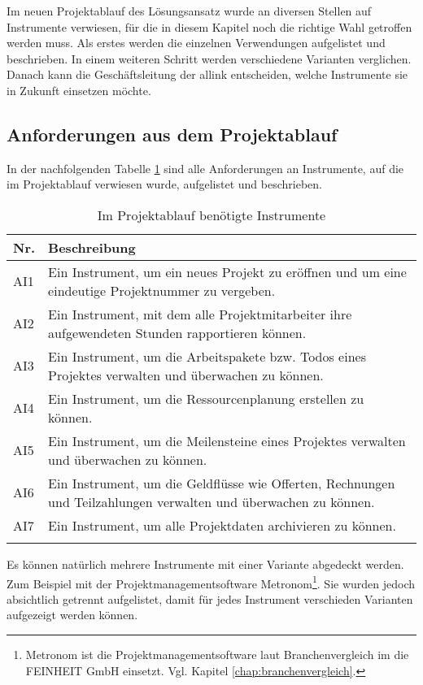 Im neuen Projektablauf des Lösungsansatz wurde an diversen Stellen auf Instrumente
verwiesen, für die in diesem Kapitel noch die richtige Wahl getroffen werden
muss. Als erstes werden die einzelnen Verwendungen aufgelistet und beschrieben.
In einem weiteren Schritt werden verschiedene Varianten verglichen. Danach
kann die Geschäftsleitung der allink entscheiden, welche Instrumente sie
in Zukunft einsetzen möchte.

\subsection{Anforderungen aus dem Projektablauf}
In der nachfolgenden Tabelle \ref{tab:projektablauf_instrumente} sind alle
Anforderungen an Instrumente, auf die im Projektablauf verwiesen wurde, aufgelistet 
und beschrieben.

\begin{longtable}{lp{14cm}}
    \toprule \textbf{Nr.} & \textbf{Beschreibung} \\
    \midrule AI1 & Ein Instrument, um ein neues Projekt zu eröffnen und um eine 
        eindeutige Projektnummer zu vergeben. \\
    \midrule AI2 & Ein Instrument, mit dem alle Projektmitarbeiter ihre 
        aufgewendeten Stunden rapportieren können. \\
    \midrule AI3 & Ein Instrument, um die Arbeitspakete bzw. Todos eines Projektes
        verwalten und überwachen zu können. \\
    \midrule AI4 & Ein Instrument, um die Ressourcenplanung erstellen zu können. \\
    \midrule AI5 & Ein Instrument, um die Meilensteine eines Projektes verwalten 
        und überwachen zu können.\\
    \midrule AI6 & Ein Instrument, um die Geldflüsse wie Offerten, Rechnungen 
        und Teilzahlungen verwalten und überwachen zu können. \\
    \midrule AI7 & Ein Instrument, um alle Projektdaten archivieren zu können. \\
    \bottomrule
    \caption[Im Projektablauf benötigte Instrumente]{Im Projektablauf benötigte 
        Instrumente\footnotemark}
    \label{tab:projektablauf_instrumente}
\end{longtable}

Es können natürlich mehrere Instrumente mit einer Variante abgedeckt werden.
Zum Beispiel mit der Projektmanagementsoftware Metronom\footnote{Metronom ist die 
Projektmanagementsoftware laut Branchenvergleich im  die FEINHEIT GmbH einsetzt.
Vgl. Kapitel \ref{chap:branchenvergleich}.}. Sie wurden jedoch absichtlich getrennt 
aufgelistet, damit für jedes Instrument verschieden Varianten aufgezeigt werden können.


